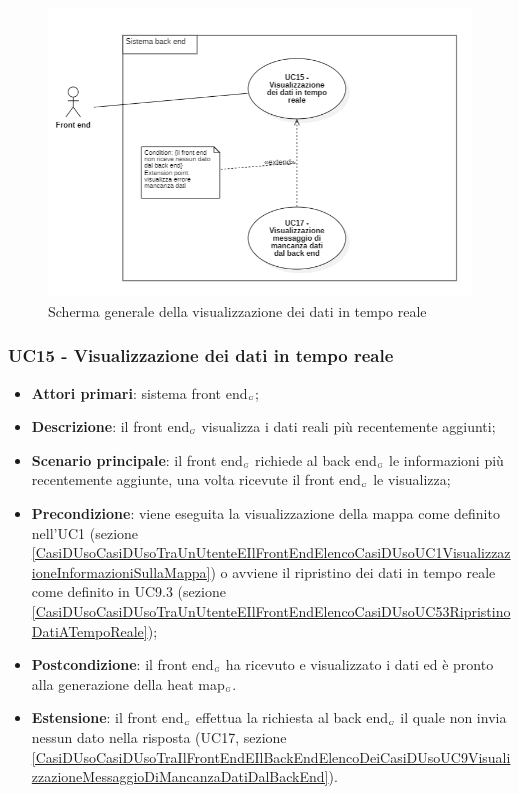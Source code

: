 \begin{center}
	\begin{figure}[H]
		\centering\includegraphics[scale=0.6]{../immagini/attori_casi/UC_15.png}
		\caption{Scherma generale della visualizzazione dei dati in tempo reale}
	\end{figure}
\end{center}


\subsubsection{UC15 - Visualizzazione dei dati in tempo reale}\label{CasiDUsoCasiDUsoTraIlFrontEndEIlBackEndElencoDeiCasiDUsoUC82VisualizzazioneDeiDatiInTempoReale}
\begin{itemize}
	\item \textbf{Attori primari}: sistema front end$_{\scaleto{G}{3pt}}$;
	\item \textbf{Descrizione}: il front end$_{\scaleto{G}{3pt}}$ visualizza i dati reali più recentemente aggiunti;
	\item \textbf{Scenario principale}: il front end$_{\scaleto{G}{3pt}}$ richiede al back end$_{\scaleto{G}{3pt}}$ le informazioni più recentemente aggiunte, una volta ricevute il front end$_{\scaleto{G}{3pt}}$ le visualizza;
	\item \textbf{Precondizione}: viene eseguita la visualizzazione della mappa come definito nell’UC1 (sezione \ref{CasiDUsoCasiDUsoTraUnUtenteEIlFrontEndElencoCasiDUsoUC1VisualizzazioneInformazioniSullaMappa}) o avviene il ripristino dei dati in tempo reale come definito in UC9.3 (sezione \ref{CasiDUsoCasiDUsoTraUnUtenteEIlFrontEndElencoCasiDUsoUC53RipristinoDatiATempoReale});
	\item \textbf{Postcondizione}: il front end$_{\scaleto{G}{3pt}}$ ha ricevuto e visualizzato i dati ed è pronto alla generazione della heat map$_{\scaleto{G}{3pt}}$.
	\item \textbf{Estensione}: il front end$_{\scaleto{G}{3pt}}$ effettua la richiesta al back end$_{\scaleto{G}{3pt}}$ il quale non invia nessun dato nella risposta (UC17, sezione \ref{CasiDUsoCasiDUsoTraIlFrontEndEIlBackEndElencoDeiCasiDUsoUC9VisualizzazioneMessaggioDiMancanzaDatiDalBackEnd}).
\end{itemize}

